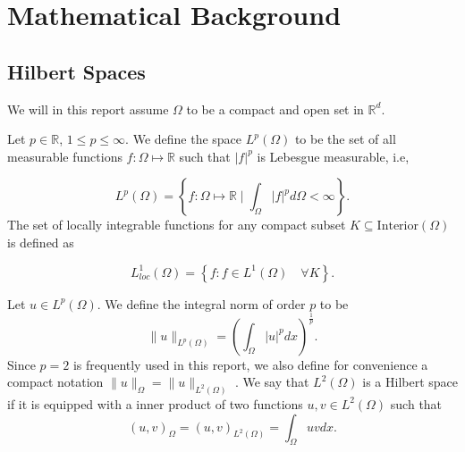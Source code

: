 
\newpage
\section{Mathematical Background}%
\label{sec:background_}

\subsection{Hilbert Spaces}%
\label{ssub:hilbert_spaces}

We will in this report assume $\Omega $ to be a compact and open set in $\mathbb{R} ^{d}$.

\begin{definition}
Let $p \in \mathbb{R} $, $ 1 \le  p \le  \infty$. We define the space $L^{p}\left( \Omega  \right) $ to be the set of all measurable functions $f: \Omega  \mapsto \mathbb{R} $ such that
$\left\lvert f \right\rvert ^{p}$ is Lebesgue measurable, i.e,

\begin{equation*}
    L^{p}\left( \Omega  \right) = \left\{ f: \Omega \mapsto \mathbb{R}  \mid \int_{\Omega }^{} \left\lvert f \right\rvert ^{p} d \Omega  < \infty  \right\}
.\end{equation*}
The set of locally integrable functions for any compact subset $K \subseteq \text{Interior}\left( \Omega  \right) $ is defined as

\begin{equation*}
    L_{loc}^{1}\left( \Omega  \right)  = \left\{ f: f \in L^{1}\left( \Omega  \right)  \quad \forall K   \right\}.
\end{equation*}
\end{definition}


Let $u \in L^{p}\left( \Omega  \right) $. We define the integral norm of order $p$ to be \[
\| u \|_{ L^{p}\left( \Omega  \right)  }^{  }  = \left( \int_{\Omega }^{} \left\lvert u \right\rvert ^{p} dx  \right) ^{\frac{1}{p}}.
\]
Since $p=2$ is frequently used in this report, we also define for convenience a compact notation $\| u \|_{ \Omega  }^{  }  = \| u \|_{ L^{2}\left( \Omega  \right)  }^{  } $ .  We say that $L^{2}\left( \Omega  \right) $ is a Hilbert space if it is equipped with a inner
product of two functions $u,v \in L^{2}\left( \Omega  \right) $ such that
\[
\left( u,v \right) _{\Omega } = \left( u,v \right) _{L^2\left( \Omega  \right) } = \int_{\Omega }^{} u  v dx.
\]


